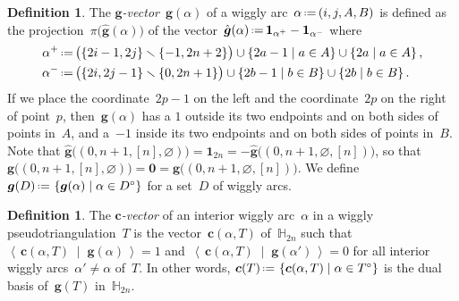 \documentclass{amsart}
\theoremstyle{definition}
\newtheorem{definition}[theorem]{Definition}
\newcommand{\HH}{\mathbb{H}} %
\renewcommand{\b}[1]{{\boldsymbol{#1}}} %
\newcommand{\set}[2]{\left\{ #1 \;\middle|\; #2 \right\}} %
\newcommand{\ssm}{\smallsetminus} %
\newcommand{\dotprod}[2]{\left\langle \, #1 \; \middle| \; #2 \, \right\rangle} %
\newcommand{\one}{\b{1}} %
\newcommand{\eqdef}{\mbox{\,\raisebox{0.2ex}{\scriptsize\ensuremath{\mathrm:}}\ensuremath{=}\,}} %
\newcommand{\darkblue}{\color{darkblue}} %
\newcommand{\defn}[1]{\textsl{\darkblue #1}} %
\begin{document}
\begin{definition}
\label{def:gvectors}
The \defn{$\b{g}$-vector}~$\b{g}(\alpha)$ of a wiggly arc~$\alpha \eqdef (i, j, A, B)$ is defined as the projection~$\pi \big( \hat{\b{g}}(\alpha) \big)$ of the vector~$\hat{\b{g}}(\alpha) \eqdef \one_{\alpha^+} - \one_{\alpha^-}$ where
\begin{align*}
\alpha^+ & \eqdef \big(\{2i-1, 2j\} \ssm \{-1, 2n+2\} \big) \cup \set{2a-1}{a \in A} \cup \set{2a}{a \in A},
\\
\alpha^- & \eqdef \big(\{2i, 2j-1\} \ssm \{0, 2n+1\} \big) \cup \set{2b-1}{b \in B} \cup \set{2b}{b \in B}.
\end{align*}
If we place the coordinate~$2p-1$ on the left and the coordinate~$2p$ on the right of point~$p$, then~$\b{g}(\alpha)$ has a $1$ outside its two endpoints and on both sides of points in~$A$, and a~$-1$ inside its two endpoints and on both sides of points in~$B$.
Note that ${\hat{\b{g}} \big( (0, n+1, [n], \varnothing) \big) = \one_{2n} = - \hat{\b{g}} \big( (0, n+1, \varnothing, [n]) \big)}$, so that~${\b{g} \big( (0, n+1, [n], \varnothing) \big) = \b{0} = \b{g} \big( (0, n+1, \varnothing, [n]) \big)}$.
We define~$\b{g}(D) \eqdef \set{\b{g}(\alpha)}{\alpha \in D^\circ}$ for a set~$D$ of wiggly arcs.
\end{definition}

\begin{definition}
\label{def:cvectors}
The \defn{$\b{c}$-vector} of an interior wiggly arc~$\alpha$ in a wiggly pseudotriangulation~$T$ is the vector~$\b{c}(\alpha, T)$ of~$\HH_{2n}$ such that~$\dotprod{\b{c}(\alpha, T)}{\b{g}(\alpha)} = 1$ and~$\dotprod{\b{c}(\alpha, T)}{\b{g}(\alpha')} = 0$ for all interior wiggly arcs~$\alpha' \ne \alpha$ of~$T$.
In other words, $\b{c}(T) \eqdef \set{\b{c}(\alpha, T)}{\alpha \in T^\circ}$ is the dual basis of~$\b{g}(T)$ in~$\HH_{2n}$.
\end{definition}
\end{document}
